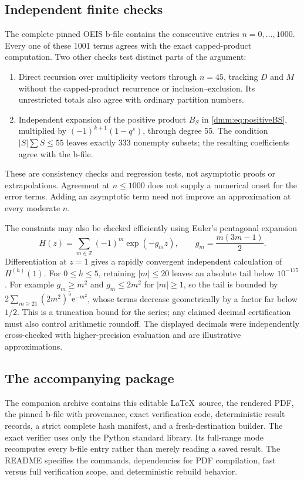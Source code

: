 \documentclass[11pt,letterpaper]{article}
\numberwithin{equation}{section}
\theoremstyle{definition}\newtheorem{definition}[theorem]{Definition}
\theoremstyle{remark}\newtheorem{remark}[theorem]{Remark}
\newcommand{\ee}{\mathrm e}
\begin{document}
\subsection{Independent finite checks}
The complete pinned OEIS b-file contains the consecutive entries $n=0,\ldots,1000$. Every one of these 1001 terms agrees with the exact capped-product computation. Two other checks test distinct parts of the argument:
\begin{enumerate}[leftmargin=*,itemsep=3pt]
\item Direct recursion over multiplicity vectors through $n=45$, tracking $D$ and $M$ without the capped-product recurrence or inclusion--exclusion. Its unrestricted totals also agree with ordinary partition numbers.
\item Independent expansion of the positive product $B_S$ in \eqref{dmm:eq:positiveBS}, multiplied by $(-1)^{k+1}(1-q^s)$, through degree 55. The condition $|S|\sum S\le55$ leaves exactly 333 nonempty subsets; the resulting coefficients agree with the b-file.
\end{enumerate}
These are consistency checks and regression tests, not asymptotic proofs or extrapolations. Agreement at $n\le1000$ does not supply a numerical onset for the error terms. Adding an asymptotic term need not improve an approximation at every moderate $n$.

The constants may also be checked efficiently using Euler's pentagonal expansion
\begin{equation}\label{dmm:eq:pentagonal}
H(z)=\sum_{m\in\mathbb Z}(-1)^m\exp(-g_mz),
\qquad g_m=\frac{m(3m-1)}2.
\end{equation}
Differentiation at $z=1$ gives a rapidly convergent independent calculation of $H^{(h)}(1)$. For $0\le h\le5$, retaining $|m|\le20$ leaves an absolute tail below $10^{-175}$. For example $g_m\ge m^2$ and $g_m\le2m^2$ for $|m|\ge1$, so the tail is bounded by $2\sum_{m\ge21}(2m^2)^5\ee^{-m^2}$, whose terms decrease geometrically by a factor far below $1/2$. This is a truncation bound for the series; any claimed decimal certification must also control arithmetic roundoff. The displayed decimals were independently cross-checked with higher-precision evaluation and are illustrative approximations.

\subsection{The accompanying package}
The companion archive contains this editable \LaTeX\ source, the rendered PDF, the pinned b-file with provenance, exact verification code, deterministic result records, a strict complete hash manifest, and a fresh-destination builder. The exact verifier uses only the Python standard library. Its full-range mode recomputes every b-file entry rather than merely reading a saved result. The README specifies the commands, dependencies for PDF compilation, fast versus full verification scope, and deterministic rebuild behavior.
\end{document}
